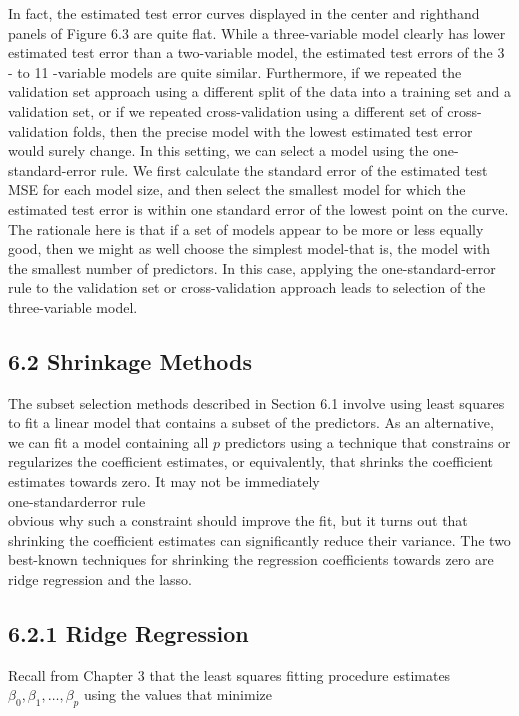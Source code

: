 \documentclass[10pt]{article}
\begin{document}
In fact, the estimated test error curves displayed in the center and righthand panels of Figure 6.3 are quite flat. While a three-variable model clearly has lower estimated test error than a two-variable model, the estimated test errors of the 3 - to 11 -variable models are quite similar. Furthermore, if we repeated the validation set approach using a different split of the data into a training set and a validation set, or if we repeated cross-validation using a different set of cross-validation folds, then the precise model with the lowest estimated test error would surely change. In this setting, we can select a model using the one-standard-error rule. We first calculate the standard error of the estimated test MSE for each model size, and then select the smallest model for which the estimated test error is within one standard error of the lowest point on the curve. The rationale here is that if a set of models appear to be more or less equally good, then we might as well choose the simplest model-that is, the model with the smallest number of predictors. In this case, applying the one-standard-error rule to the validation set or cross-validation approach leads to selection of the three-variable model.

\subsection*{6.2 Shrinkage Methods}
The subset selection methods described in Section 6.1 involve using least squares to fit a linear model that contains a subset of the predictors. As an alternative, we can fit a model containing all $p$ predictors using a technique that constrains or regularizes the coefficient estimates, or equivalently, that shrinks the coefficient estimates towards zero. It may not be immediately\\
one-standarderror rule\\
obvious why such a constraint should improve the fit, but it turns out that shrinking the coefficient estimates can significantly reduce their variance. The two best-known techniques for shrinking the regression coefficients towards zero are ridge regression and the lasso.

\subsection*{6.2.1 Ridge Regression}
Recall from Chapter 3 that the least squares fitting procedure estimates $\beta_{0}, \beta_{1}, \ldots, \beta_{p}$ using the values that minimize
\end{document}
